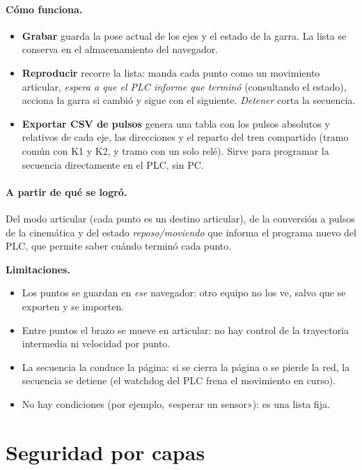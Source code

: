 \documentclass[a4paper,11pt]{article}
\newcommand{\limite}[1]{\par\smallskip\noindent\colorbox{rojo!8}{\parbox{\dimexpr\linewidth-2\fboxsep}{\textbf{\color{rojo}Limitaciones.} #1}}\par\smallskip}
\begin{document}
\paragraph{Cómo funciona.}
\begin{itemize}
\item \textbf{Grabar} guarda la pose actual de los ejes y el estado de la garra. La lista se conserva en el almacenamiento del navegador.
\item \textbf{Reproducir} recorre la lista: manda cada punto como un movimiento articular, \emph{espera a que el PLC informe que terminó} (consultando el estado), acciona la garra si cambió y sigue con el siguiente. \emph{Detener} corta la secuencia.
\item \textbf{Exportar CSV de pulsos} genera una tabla con los pulsos absolutos y relativos de cada eje, las direcciones y el reparto del tren compartido (tramo común con K1 y K2, y tramo con un solo relé). Sirve para programar la secuencia directamente en el PLC, sin PC.
\end{itemize}

\paragraph{A partir de qué se logró.} Del modo articular (cada punto es un destino articular), de la conversión a pulsos de la cinemática y del estado \emph{reposo/moviendo} que informa el programa nuevo del PLC, que permite saber cuándo terminó cada punto.

\limite{\begin{itemize}[leftmargin=5mm, topsep=0pt]
\item Los puntos se guardan en \emph{ese} navegador: otro equipo no los ve, salvo que se exporten y se importen.
\item Entre puntos el brazo se mueve en articular: no hay control de la trayectoria intermedia ni velocidad por punto.
\item La secuencia la conduce la página: si se cierra la página o se pierde la red, la secuencia se detiene (el watchdog del PLC frena el movimiento en curso).
\item No hay condiciones (por ejemplo, «esperar un sensor»): es una lista fija.
\end{itemize}}



\section{Seguridad por capas}
\end{document}
